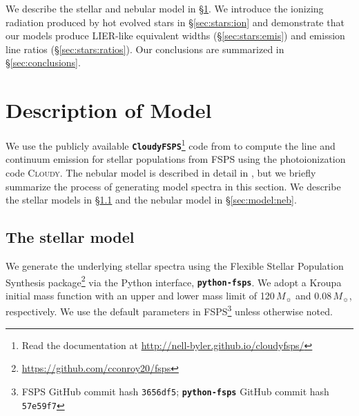 \documentclass[preprint2]{aastex62}
\newcommand{\FSPS}{{\sc FSPS}\xspace}
\newcommand{\pFSPS}{{\tt \textbf{python-fsps}}\xspace}
\newcommand{\CloudyFSPS}{{\tt \textbf{CloudyFSPS}}\xspace}
\newcommand{\Cloudy}{\textsc{Cloudy}\xspace}
\newcommand\Msun{\ensuremath{\,M_{\sun}}\xspace}
\begin{document}
We describe the stellar and nebular model in \S\ref{sec:model}. We introduce the ionizing radiation produced by hot evolved stars in \S\ref{sec:stars:ion} and demonstrate that our models produce LIER-like equivalent widths (\S\ref{sec:stars:emis}) and emission line ratios (\S\ref{sec:stars:ratios}). Our conclusions are summarized in \S\ref{sec:conclusions}.

\section{Description of Model}\label{sec:model}

We use the publicly available \CloudyFSPS\footnote{Read the documentation at \url{http://nell-byler.github.io/cloudyfsps/}} \citep{cloudyFSPSv1} code from \citet{Byler+2017} to compute the line and continuum emission for stellar populations from \FSPS using the photoionization code \Cloudy. The nebular model is described in detail in \citet{Byler+2017}, but we briefly summarize the process of generating model spectra in this section. We describe the stellar models in \S\ref{sec:model:stellar} and the nebular model in \S\ref{sec:model:neb}.

\subsection{The stellar model}\label{sec:model:stellar}

We generate the underlying stellar spectra using the Flexible Stellar Population Synthesis package\footnote{\url{https://github.com/cconroy20/fsps}} \citep[FSPS; ][]{Conroy+2009, Conroy+2010} via the Python interface, \pFSPS \citep{pythonFSPSdfm}. We adopt a Kroupa initial mass function \citep[IMF;][]{Kroupa+2001} with an upper and lower mass limit of 120\Msun and 0.08\Msun, respectively. We use the default parameters in \FSPS\footnote{\FSPS GitHub commit hash \texttt{3656df5}; \pFSPS GitHub commit hash \texttt{57e59f7}} unless otherwise noted.
\end{document}
